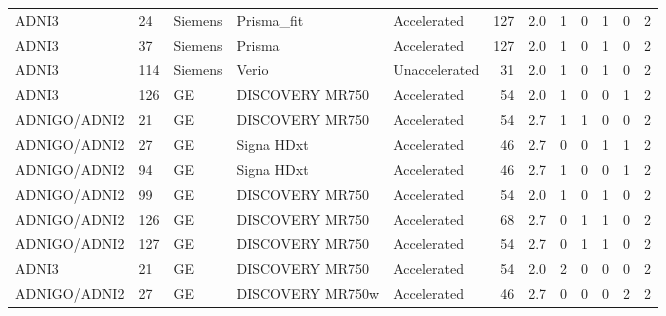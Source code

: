 \documentclass{article}
\providecommand{\DIFaddtex}[1]{{\protect\color{blue}#1}} %
\providecommand{\DIFadd}[1]{\texorpdfstring{\DIFaddtex{#1}}{#1}} %
\begin{document}
\begin{landscape}
\begin{longtable}{lllllrrrrrrr}
\DIFadd{ADNI3 }& \DIFadd{24 }& \DIFadd{Siemens }& \DIFadd{Prisma\_fit }& \DIFadd{Accelerated }& \DIFadd{127 }& \DIFadd{2.0 }& \DIFadd{1 }& \DIFadd{0 }& \DIFadd{1 }& \DIFadd{0 }& \DIFadd{2 }\\
\DIFadd{ADNI3 }& \DIFadd{37 }& \DIFadd{Siemens }& \DIFadd{Prisma }& \DIFadd{Accelerated }& \DIFadd{127 }& \DIFadd{2.0 }& \DIFadd{1 }& \DIFadd{0 }& \DIFadd{1 }& \DIFadd{0 }& \DIFadd{2 }\\
\DIFadd{ADNI3 }& \DIFadd{114 }& \DIFadd{Siemens }& \DIFadd{Verio }& \DIFadd{Unaccelerated }& \DIFadd{31 }& \DIFadd{2.0 }& \DIFadd{1 }& \DIFadd{0 }& \DIFadd{1 }& \DIFadd{0 }& \DIFadd{2 }\\
\DIFadd{ADNI3 }& \DIFadd{126 }& \DIFadd{GE }& \DIFadd{DISCOVERY MR750 }& \DIFadd{Accelerated }& \DIFadd{54 }& \DIFadd{2.0 }& \DIFadd{1 }& \DIFadd{0 }& \DIFadd{0 }& \DIFadd{1 }& \DIFadd{2 }\\
\DIFadd{ADNIGO/ADNI2 }& \DIFadd{21 }& \DIFadd{GE }& \DIFadd{DISCOVERY MR750 }& \DIFadd{Accelerated }& \DIFadd{54 }& \DIFadd{2.7 }& \DIFadd{1 }& \DIFadd{1 }& \DIFadd{0 }& \DIFadd{0 }& \DIFadd{2 }\\
\DIFadd{ADNIGO/ADNI2 }& \DIFadd{27 }& \DIFadd{GE }& \DIFadd{Signa HDxt }& \DIFadd{Accelerated }& \DIFadd{46 }& \DIFadd{2.7 }& \DIFadd{0 }& \DIFadd{0 }& \DIFadd{1 }& \DIFadd{1 }& \DIFadd{2 }\\
\DIFadd{ADNIGO/ADNI2 }& \DIFadd{94 }& \DIFadd{GE }& \DIFadd{Signa HDxt }& \DIFadd{Accelerated }& \DIFadd{46 }& \DIFadd{2.7 }& \DIFadd{1 }& \DIFadd{0 }& \DIFadd{0 }& \DIFadd{1 }& \DIFadd{2 }\\
\DIFadd{ADNIGO/ADNI2 }& \DIFadd{99 }& \DIFadd{GE }& \DIFadd{DISCOVERY MR750 }& \DIFadd{Accelerated }& \DIFadd{54 }& \DIFadd{2.0 }& \DIFadd{1 }& \DIFadd{0 }& \DIFadd{1 }& \DIFadd{0 }& \DIFadd{2 }\\
\DIFadd{ADNIGO/ADNI2 }& \DIFadd{126 }& \DIFadd{GE }& \DIFadd{DISCOVERY MR750 }& \DIFadd{Accelerated }& \DIFadd{68 }& \DIFadd{2.7 }& \DIFadd{0 }& \DIFadd{1 }& \DIFadd{1 }& \DIFadd{0 }& \DIFadd{2 }\\
\DIFadd{ADNIGO/ADNI2 }& \DIFadd{127 }& \DIFadd{GE }& \DIFadd{DISCOVERY MR750 }& \DIFadd{Accelerated }& \DIFadd{54 }& \DIFadd{2.7 }& \DIFadd{0 }& \DIFadd{1 }& \DIFadd{1 }& \DIFadd{0 }& \DIFadd{2 }\\
\DIFadd{ADNI3 }& \DIFadd{21 }& \DIFadd{GE }& \DIFadd{DISCOVERY MR750 }& \DIFadd{Accelerated }& \DIFadd{54 }& \DIFadd{2.0 }& \DIFadd{2 }& \DIFadd{0 }& \DIFadd{0 }& \DIFadd{0 }& \DIFadd{2 }\\
\DIFadd{ADNIGO/ADNI2 }& \DIFadd{27 }& \DIFadd{GE }& \DIFadd{DISCOVERY MR750w }& \DIFadd{Accelerated }& \DIFadd{46 }& \DIFadd{2.7 }& \DIFadd{0 }& \DIFadd{0 }& \DIFadd{0 }& \DIFadd{2 }& \DIFadd{2 }\\

\end{longtable}
\end{landscape}
\end{document}
